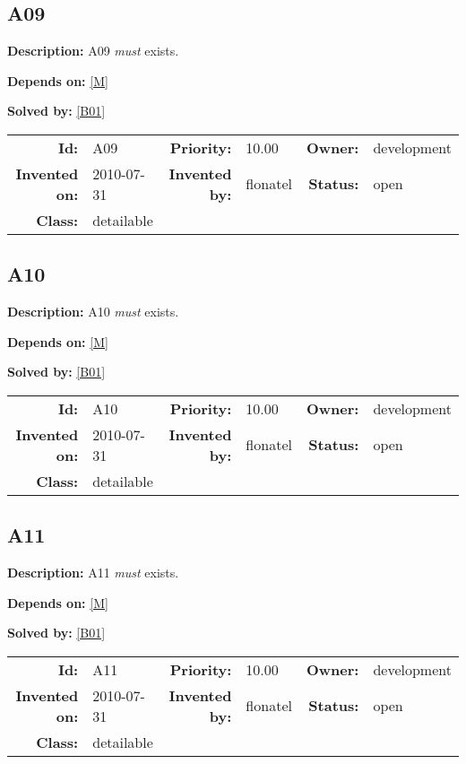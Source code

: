 \subsection{A09}\label{A09}
\textbf{Description:} A09 \textsl{must} exists.

\textbf{Depends on:} \ref{M} 

\textbf{Solved by:} \ref{B01} 

\par
{\small \begin{center}\begin{tabular}{rlrlrl}
\textbf{Id:} & A09  & \textbf{Priority:} & 10.00  & \textbf{Owner:} & development\\ 
\textbf{Invented on:} & 2010-07-31  & \textbf{Invented by:} & flonatel  & \textbf{Status:} & open \\ 
\textbf{Class:} & detailable  & & & \end{tabular}\end{center} }
\subsection{A10}\label{A10}
\textbf{Description:} A10 \textsl{must} exists.

\textbf{Depends on:} \ref{M} 

\textbf{Solved by:} \ref{B01} 

\par
{\small \begin{center}\begin{tabular}{rlrlrl}
\textbf{Id:} & A10  & \textbf{Priority:} & 10.00  & \textbf{Owner:} & development\\ 
\textbf{Invented on:} & 2010-07-31  & \textbf{Invented by:} & flonatel  & \textbf{Status:} & open \\ 
\textbf{Class:} & detailable  & & & \end{tabular}\end{center} }
\subsection{A11}\label{A11}
\textbf{Description:} A11 \textsl{must} exists.

\textbf{Depends on:} \ref{M} 

\textbf{Solved by:} \ref{B01} 

\par
{\small \begin{center}\begin{tabular}{rlrlrl}
\textbf{Id:} & A11  & \textbf{Priority:} & 10.00  & \textbf{Owner:} & development\\ 
\textbf{Invented on:} & 2010-07-31  & \textbf{Invented by:} & flonatel  & \textbf{Status:} & open \\ 
\textbf{Class:} & detailable  & & & \end{tabular}\end{center} }

